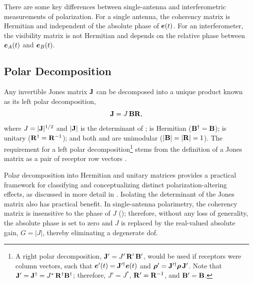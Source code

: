 There are some key differences between single-antenna and interferometric measurements of polarization.  For a single antenna, the coherency matrix is Hermitian and independent of the absolute phase of $\mbox{\boldmath $e$}(t)$.  For an interferometer, the visibility matrix is not Hermitian and depends on the relative phase between $\mbox{\boldmath $e$}_A(t)$ and $\mbox{\boldmath $e$}_B(t)$.




\subsection{Polar Decomposition}
\label{sec:polar_decomposition}



%
Any invertible Jones matrix ${\bf J}$ can be decomposed into a unique product known as its left polar decomposition,
%
\begin{equation}
\label{eqn:polar}
{\bf J} = J \, {\bf B} {\bf R},
\end{equation}
where $J=|{\bf J}|^{1/2}$ and $|{\bf J}|$ is the determinant of ;
 is Hermitian 
(${\bf B}^\dagger={\bf B}$);
 is unitary
(${\bf R}^\dagger = {\bf R}^{-1}$);
and both  and  are unimodular ($|{\bf B}| = |{\bf R}| = 1$).
%
The requirement for a left polar decomposition\footnote{
A right polar decomposition,
${\bf J}' = J' \, {\bf R}' \, {\bf B}'$, would be used if receptors were column vectors, such that
$\mbox{\boldmath $e$}'(t)={\bf J}^{\prime\dagger}\mbox{\boldmath $e$}(t)$ 
and
${\mbox{\boldmath $\rho$}'}={\bf J}^{\prime\dagger}\mbox{\boldmath $\rho$}\, {\bf J}'$.  Note that ${\bf J}'={\bf J}^\dagger = J^* \, {\bf R}^\dagger {\bf B}^\dagger$; therefore,
$J'=J^*$, ${\bf R}'={\bf R}^{-1}$, and ${\bf B}'={\bf B}$.
} stems from the definition of a Jones matrix as a pair of receptor row vectors .   


Polar decomposition into Hermitian and unitary matrices provides a practical framework for classifying and conceptualizing distinct polarization-altering effects, as discussed in more detail in .
%
Isolating the determinant of the Jones matrix also has practical benefit.
In single-antenna polarimetry, the coherency matrix is insensitive to the phase of $J$ (); therefore, 
without any loss of generality, 
the absolute phase is set to zero
%
and $J$ is replaced by the real-valued absolute gain, $G=|J|$, thereby eliminating a degenerate dof.


